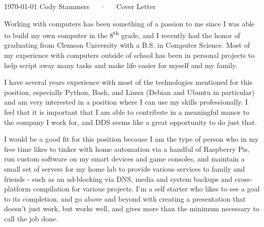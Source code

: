 \documentclass[11pt, a4paper]{awesome-cv}
\begin{document}
\makecvheader[R]

\makecvfooter
  {\today}
  {Cody Stammers~~~·~~~Cover Letter}
  {}


\begin{cvletter}

Working with computers has been something of a passion to me since I was able to build my own computer in the 8\textsuperscript{th} grade, and I recently had the honor of graduating from Clemson University with a B.S. in Computer Science. Most of my experience with computers outside of school has been in personal projects to help script away many tasks and make life easier for myself and my family.

I have several years experience with most of the technologies mentioned for this position, especially Python, Bash, and Linux (Debian and Ubuntu in particular) and am very interested in a position where I can use my skills professionally. I feel that it is important that I am able to contribute in a meaningful manor to the company I work for, and DDS seems like a great opportunity to do just that.

I would be a good fit for this position because I am the type of person who in my free time likes to tinker with home automation via a handful of Raspberry Pis, run custom software on my smart devices and game consoles, and maintain a small set of servers for my home lab to provide various services to family and friends - such as an ad-blocking via DNS, media and system backups and cross-platform compilation for various projects. I'm a self starter who likes to see a goal to its completion, and go above and beyond with creating a presentation that doesn't just work, but works well, and gives more than the minimum necessary to call the job done.

\end{cvletter}


\makeletterclosing
\end{document}
